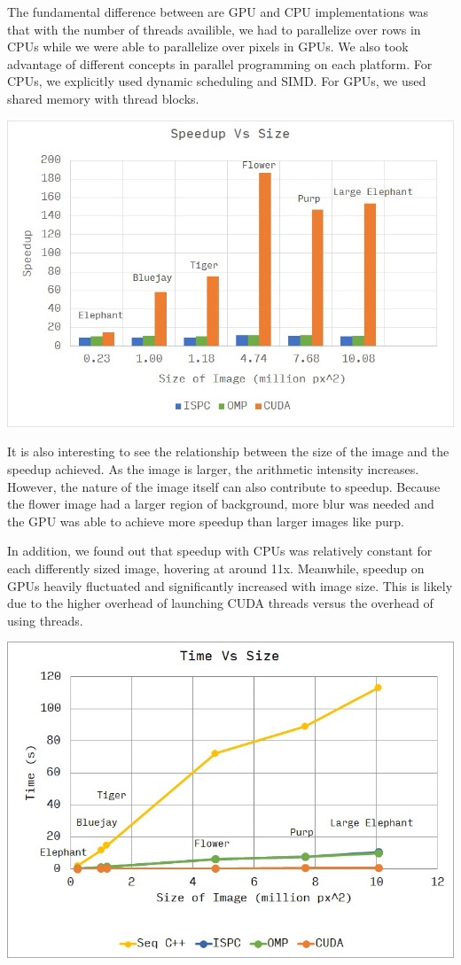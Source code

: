 \documentclass[12pt]{article}
\begin{document}
The fundamental difference between are GPU and CPU implementations was that
with the number of threads availible, we had to parallelize over rows in CPUs
while we were able to parallelize over pixels in GPUs. We also took advantage
of different concepts in parallel programming on each platform. For CPUs, we
explicitly used dynamic scheduling and SIMD. For GPUs, we used shared memory
with thread blocks.

\begin{center}
\includegraphics[scale=0.8]{speedup.jpg}
\end{center}

It is also interesting to see the relationship between the size of the image
and the speedup achieved. As the image is larger, the arithmetic intensity
increases. However, the nature of the image itself can also contribute to
speedup. Because the flower image had a larger region of background, more blur
was needed and the GPU was able to achieve more speedup than larger images like
purp.

In addition, we found out that speedup with CPUs was relatively constant
for each differently sized image, hovering at around 11x. Meanwhile, speedup
on GPUs heavily fluctuated and significantly increased with image size. This
is likely due to the higher overhead of launching CUDA threads versus the
overhead of using threads.

\begin{center}
\includegraphics[scale=0.8]{time.jpg}
\end{center}
\end{document}
